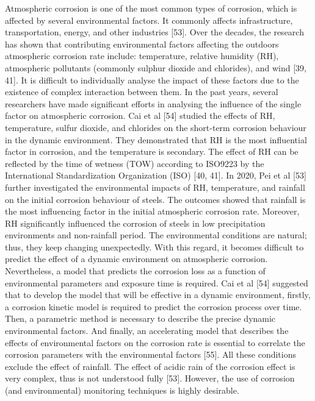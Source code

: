 \documentclass[12pt]{report}
\begin{document}
Atmospheric corrosion is one of the most common types of corrosion, which is affected by several environmental factors. It commonly affects infrastructure, transportation, energy, and other industries [53]. Over the decades, the research has shown that contributing environmental factors affecting the outdoors atmospheric corrosion rate include: temperature, relative humidity (RH), atmospheric pollutants (commonly sulphur dioxide and chlorides), and wind [39, 41]. It is difficult to individually analyse the impact of these factors due to the existence of complex interaction between them.
In the past years, several researchers have made significant efforts in analysing the influence of the single factor on atmospheric corrosion. Cai et al [54] studied the effects of RH, temperature, sulfur dioxide, and chlorides on the short-term corrosion behaviour in the dynamic environment. They demonstrated that RH is the most influential factor in corrosion, and the temperature is secondary. The effect of RH can be reflected by the time of wetness (TOW) according to ISO9223 by the International Standardization Organization (ISO) [40, 41]. In 2020, Pei et al [53] further investigated the environmental impacts of RH, temperature, and rainfall on the initial corrosion behaviour of steels. The outcomes showed that rainfall is the most influencing factor in the initial atmospheric corrosion rate.  Moreover, RH significantly influenced the corrosion of steels in low precipitation environments and non-rainfall period.
The environmental conditions are natural; thus, they keep changing unexpectedly. With this regard, it becomes difficult to predict the effect of a dynamic environment on atmospheric corrosion. Nevertheless, a model that predicts the corrosion loss as a function of environmental parameters and exposure time is required. Cai et al [54] suggested that to develop the model that will be effective in a dynamic environment, firstly, a corrosion kinetic model is required to predict the corrosion process over time. Then, a parametric method is necessary to describe the precise dynamic environmental factors. And finally, an accelerating model that describes the effects of environmental factors on the corrosion rate is essential to correlate the corrosion parameters with the environmental factors [55]. All these conditions exclude the effect of rainfall. The effect of acidic rain of the corrosion effect is very complex, thus is not understood fully [53]. However, the use of corrosion (and environmental) monitoring techniques is highly desirable.
\end{document}
